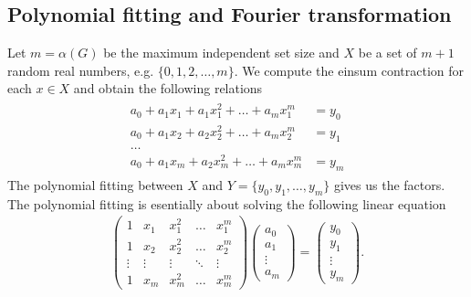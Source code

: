 \documentclass{article}
\newcommand{\<}{\langle}
\renewcommand{\>}{\rangle}
\theoremstyle{definition}\newtheorem{definition}{\textit{Definition}}
\begin{document}
\subsection{Polynomial fitting and Fourier transformation}
Let $m=\alpha(G)$ be the maximum independent set size and $X$ be a set of $m+1$ random real numbers, e.g. $\{0, 1, 2, \ldots, m\}$.
We compute the einsum contraction for each $x \in X$ and obtain the following relations
\begin{align}
    \begin{split}
a_0 + a_1 x_1 + a_1 x_1^2 + \ldots + a_m x_1^m &= y_0\\
a_0 + a_1 x_2 + a_2 x_2^2 + \ldots + a_m x_2^m &= y_1\\
\ldots&\\
a_0 + a_1 x_m + a_2 x_m^2 + \ldots + a_m x_m^m& = y_m
    \end{split}
\end{align}
The polynomial fitting between $X$ and $Y = \{y_0, y_1, \ldots, y_m\}$ gives us the factors.
The polynomial fitting is esentially about solving the following linear equation
\begin{align}
\left(\begin{matrix}
1 & x_1 & x_1^2 & \ldots & x_1^m \\
1 & x_2 & x_2^2 & \ldots & x_2^m \\
\vdots & \vdots & \vdots &\ddots & \vdots \\
1 & x_m & x_m^2 & \ldots & x_m^m
\end{matrix}\right)
\left(\begin{matrix}
a_0 \\ a_1 \\ \vdots \\ a_m
\end{matrix}\right)
= \left(\begin{matrix}
y_0 \\ y_1 \\ \vdots \\ y_m
\end{matrix}\right).
\end{align}
\end{document}
